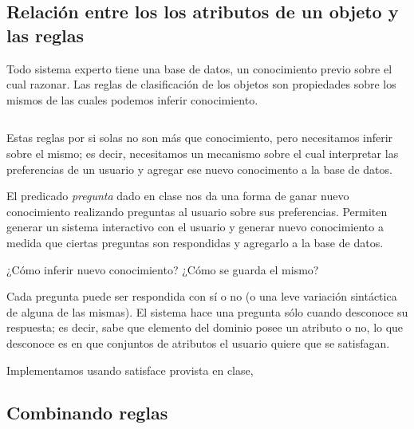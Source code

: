 \documentclass[11pt,oneside,a4paper]{article}
\begin{document}
\subsection{Relación entre los los atributos de un objeto y las reglas}


Todo sistema experto tiene una base de datos, un conocimiento previo sobre el
cual razonar. Las reglas de clasificación de los objetos son propiedades
sobre los mismos de las cuales podemos inferir conocimiento.

\inputminted[firstline=1, lastline=13, fontsize=\footnotesize]{perl}{tp-prolog.pl}

Estas reglas por si solas no son más que conocimiento, pero necesitamos inferir 
sobre el mismo; es decir, necesitamos un mecanismo sobre el cual interpretar las preferencias 
de un usuario y agregar ese nuevo conocimento a la base de datos.


El predicado \emph{pregunta} dado en clase nos da una forma de ganar nuevo conocimiento
realizando preguntas al usuario sobre sus preferencias.
Permiten generar un sistema interactivo con el usuario y generar nuevo
conocimiento a medida que ciertas preguntas son respondidas y agregarlo a
la base de datos.



¿Cómo inferir nuevo conocimiento? ¿Cómo se guarda el mismo?

Cada pregunta puede ser respondida con sí o no (o una leve variación 
sintáctica de alguna de las mismas). El sistema hace una pregunta 
sólo cuando desconoce su respuesta; es decir, sabe que elemento del dominio 
posee un atributo o no, lo que desconoce es en que conjuntos de atributos 
el usuario quiere que se satisfagan.

Implementamos usando satisface  %
provista en clase,%

\subsection{Combinando reglas} %
\end{document}
